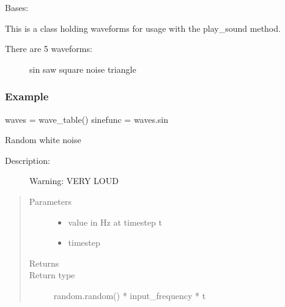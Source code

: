 \documentclass[letterpaper,10pt,english,openany,oneside]{sphinxmanual}
\begin{document}
\begin{fulllineitems}
\label{\detokenize{dpav:dpav.audio.wave_table}}
\sphinxAtStartPar
Bases: 

\sphinxAtStartPar
This is a class holding waveforms for usage with the play\_sound method.
\begin{description}
\item[{There are 5 waveforms:}] \leavevmode
\sphinxAtStartPar
sin
saw
square
noise
triangle

\end{description}
\subsubsection*{Example}

\sphinxAtStartPar
waves = wave\_table()
sinefunc = waves.sin

\begin{fulllineitems}
\label{\detokenize{dpav:dpav.audio.wave_table.noise}}
\sphinxAtStartPar
Random white noise
\begin{description}
\item[{Description:}] \leavevmode
\sphinxAtStartPar
Warning: VERY LOUD

\end{description}
\begin{quote}\begin{description}
\item[{Parameters}] \leavevmode\begin{itemize}
\item {} 
\sphinxAtStartPar
{} \textendash{} value in Hz at timestep t

\item {} 
\sphinxAtStartPar
{} \textendash{} timestep

\end{itemize}

\item[{Returns}] \leavevmode
\sphinxAtStartPar


\item[{Return type}] \leavevmode
\sphinxAtStartPar
random.random() * input\_frequency * t


\end{description}
\end{quote}
\end{fulllineitems}
\end{fulllineitems}
\end{document}
